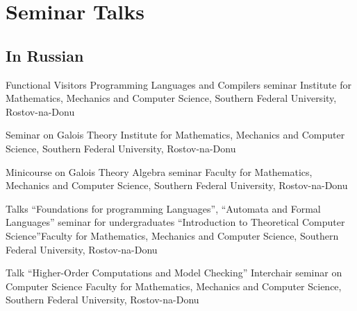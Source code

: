 \documentclass[11pt,a4paper]{moderncv}   %
\newcommand{\MyHrefImpl}[2]{%
\textcolor{blue}{\href{#1}{#2}}}
\def\LINKS{}
\newcommand*{\myhref}[2]{%
\ignorespaces%
\ifdefined\LINKS%
\MyHrefImpl{#1}{#2}%
\else%
#2%
\fi%
}
\begin{document}
\section{Seminar Talks}
{\footnotesize


\subsection{In Russian}

    {Functional Visitors}
    {Programming Languages and Compilers seminar}{}
    {Institute for Mathematics, Mechanics and Computer Science, Southern Federal University, Rostov-na-Donu}
    {%
    }

    {Seminar on Galois Theory}{}
    {Institute for Mathematics, Mechanics and Computer Science, Southern Federal University, Rostov-na-Donu}
    {%
    }{}

    {Minicourse on Galois Theory}
    {Algebra seminar}
    {Faculty for Mathematics, Mechanics and Computer Science, Southern Federal University, Rostov-na-Donu}{}{}

%
    {Talks “Foundations for programming Languages”, “Automata and Formal Languages”}%
    {seminar for undergraduates “Introduction to Theoretical Computer Science”}{Faculty for Mathematics, Mechanics and Computer Science, Southern Federal University, Rostov-na-Donu}{}%
    {%
    }

    {Talk “Higher-Order Computations and Model Checking”}
    {Interchair seminar on Computer Science}
    {Faculty for Mathematics, Mechanics and Computer Science, Southern Federal University, Rostov-na-Donu}{}%
    {%
    }

}
\end{document}
